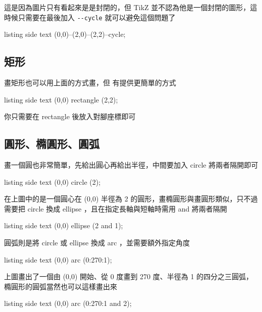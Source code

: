 這是因為圖片只有看起來是是封閉的，但 TikZ 並不認為他是一個封閉的圖形，這時候只需要在最後加入 \verb`--cycle` 就可以避免這個問題了

\begin{tcblisting}{listing side text}
\tikz {} (0,0)--(2,0)--(2,2)--cycle;
\end{tcblisting}

\subsection{矩形}

畫矩形也可以用上面的方式畫，但 \TikZ 有提供更簡單的方式

\begin{tcblisting}{listing side text}
\tikz \draw (0,0) rectangle (2,2);
\end{tcblisting}

你只需要在 rectangle 後放入對腳座標即可

\subsection{圓形、橢圓形、圓弧}

畫一個圓也非常簡單，先給出圓心再給出半徑，中間要加入 circle 將兩者隔開即可

\begin{tcblisting}{listing side text}
\tikz \draw (0,0) circle (2);
\end{tcblisting}

在上圖中的是一個圓心在 (0,0) 半徑為 2 的圓形，畫橢圓形與畫圓形類似，只不過需要把 circle 換成 ellipse ，且在指定長軸與短軸時需用 and 將兩者隔開

\begin{tcblisting}{listing side text}
\tikz \draw (0,0) ellipse (2 and 1);
\end{tcblisting}

圓弧則是將 circle 或 ellipse 換成 arc ，並需要額外指定角度

\begin{tcblisting}{listing side text}
\tikz \draw (0,0) arc (0:270:1);
\end{tcblisting}

上圖畫出了一個由 (0,0) 開始、從 0 度畫到 270 度、半徑為 1 的四分之三圓弧，橢圓形的圓弧當然也可以這樣畫出來

\begin{tcblisting}{listing side text}
\tikz \draw (0,0) arc (0:270:1 and 2);
\end{tcblisting}


